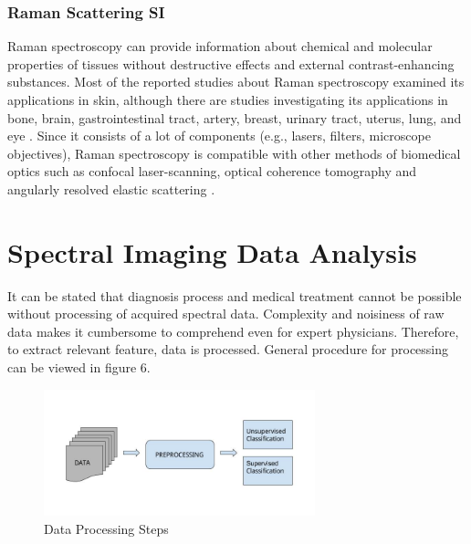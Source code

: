 \documentclass[a4paper]{article}
\begin{document}
            \subsubsection{Raman Scattering SI}
            \hspace{5mm} Raman spectroscopy can provide information about chemical and molecular properties of tissues without destructive effects and external contrast-enhancing substances. Most of the reported studies about Raman spectroscopy examined its applications in skin, although there are studies investigating its  applications in bone, brain, gastrointestinal tract, artery, breast, urinary tract, uterus, lung, and eye \cite{onalti.3}. Since it consists of a lot of components (e.g., lasers, filters, microscope objectives), Raman spectroscopy is compatible with other methods of biomedical optics such as confocal laser-scanning, optical coherence tomography and angularly resolved elastic scattering \cite{onalti.4}.


     
    
    
    
    
    


\section{Spectral Imaging Data Analysis} %
    \label{sec:Spectral_Imaging_Data_Analysis}
    
    \hspace{5mm} It can be stated that diagnosis process and medical treatment cannot be possible without processing of acquired spectral data. Complexity and noisiness of raw data makes it cumbersome  to comprehend even for expert physicians. Therefore, to extract relevant feature, data is processed. General procedure for processing can be viewed in figure 6.
    
    \begin{figure}[h]
		\includegraphics[width=0.7\textwidth]{dataAnaly.jpg}
			\centering
         \caption{Data Processing Steps}
	\end{figure}
\end{document}
